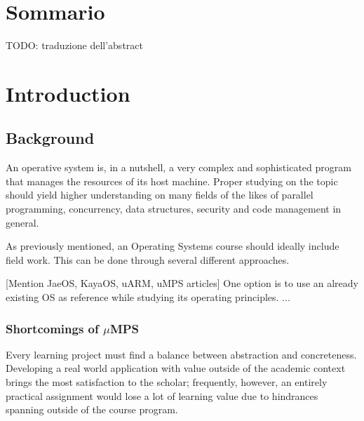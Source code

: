 \documentclass[12pt,a4paper,openright,twoside]{report}
\begin{document}
\clearpage{\pagestyle{empty}\cleardoublepage}%
\chapter*{Sommario}
TODO: traduzione dell'abstract

\clearpage{\pagestyle{empty}\cleardoublepage}
\tableofcontents                        %
\rhead[\fancyplain{}{\bfseries\leftmark}]{\fancyplain{}{\bfseries\thepage}}
\clearpage{\pagestyle{empty}\cleardoublepage}
\listoffigures                          %
\clearpage{\pagestyle{empty}\cleardoublepage}
\listoftables                           %
\clearpage{\pagestyle{empty}\cleardoublepage}
\chapter{Introduction}                %
\lhead[\fancyplain{}{\bfseries\thepage}]{\fancyplain{}{\bfseries\rightmark}}
\section{Background}
An operative system is, in a nutshell, a very complex and sophisticated program
that manages the resources of its host machine. Proper studying on the topic 
should yield higher understanding on many fields of the likes of
parallel programming, concurrency, data structures, security and 
code management in general.

As previously mentioned, an Operating Systems course should ideally include
field work. This can be done through several different approaches.

[Mention JaeOS, KayaOS, uARM, uMPS articles]
One option is to use an already existing OS as reference while studying 
its operating principles. 
...

\subsection{Shortcomings of $\mu$MPS}
Every learning project must find a balance between abstraction and concreteness.
Developing a real world application with value outside of the academic context
 brings the most satisfaction to the scholar; frequently, however, an entirely
 practical assignment would lose a lot of learning value due to hindrances
 spanning outside of the course program.
 
\end{document}
